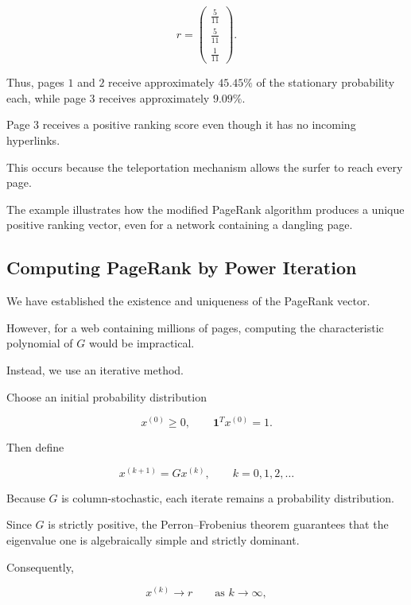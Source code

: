 \documentclass[11pt,a4paper]{article}
\theoremstyle{definition}
\theoremstyle{remark}
\begin{document}
\begin{equation}
\boxed{
r=
\begin{pmatrix}
\frac5{11}\\[1mm]
\frac5{11}\\[1mm]
\frac1{11}
\end{pmatrix}.
}
\label{eq:pagerank_dangling_result}
\end{equation}

Thus, pages $1$
and $2$ receive
approximately $45.45\%$
of the stationary
probability each,
while page $3$
receives approximately
$9.09\%$.

Page $3$ receives
a positive ranking
score even though
it has no incoming
hyperlinks.

This occurs because
the teleportation
mechanism allows
the surfer to
reach every page.

The example illustrates
how the modified
PageRank algorithm
produces a unique
positive ranking vector,
even for a network
containing a dangling page.


\subsection{Computing PageRank
by Power Iteration}

We have established
the existence and
uniqueness of the
PageRank vector.

However, for a web
containing millions
of pages, computing
the characteristic
polynomial of $G$
would be impractical.

Instead, we use
an iterative method.

Choose an initial
probability distribution

\[
x^{(0)}\geq0,
\qquad
\mathbf{1}^Tx^{(0)}=1.
\]

Then define

\begin{equation}
x^{(k+1)}=Gx^{(k)},
\qquad k=0,1,2,\ldots
\label{eq:pagerank_power_iteration}
\end{equation}

Because $G$ is
column-stochastic,
each iterate remains
a probability distribution.

Since $G$ is strictly
positive, the
Perron--Frobenius theorem
guarantees that the
eigenvalue one is
algebraically simple
and strictly dominant.

Consequently,

\begin{equation}
\boxed{
x^{(k)}\longrightarrow r
\qquad\text{as }k\to\infty,
}
\label{eq:pagerank_power_convergence}
\end{equation}
\end{document}
